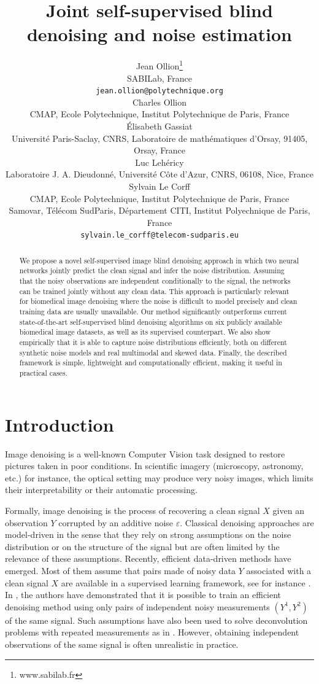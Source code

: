 \documentclass{article}
\title{Joint self-supervised blind denoising and noise estimation}
\author{%
  Jean Ollion\thanks{www.sabilab.fr}\\
  SABILab, France\\
  \texttt{jean.ollion@polytechnique.org} \\
  \And
  Charles Ollion\\
  CMAP, Ecole Polytechnique, Institut Polytechnique de Paris, France\\
  \And
  \'Elisabeth Gassiat\\
  Universit\'e Paris-Saclay, CNRS, Laboratoire de math\'ematiques d'Orsay, 91405, Orsay, France\\
  \And
  Luc Leh\'ericy\\
  Laboratoire J. A. Dieudonn\'e, Universit\'e C\^ote d'Azur, CNRS, 06108, Nice, France\\
  \And
  Sylvain Le Corff \\
  CMAP, Ecole Polytechnique, Institut Polytechnique de Paris, France\\
  Samovar, T\'el\'ecom SudParis, D\'epartement CITI, Institut Polyechnique de Paris, France\\
  \texttt{sylvain.le_corff@telecom-sudparis.eu} \\
}
\begin{document}
\maketitle

\begin{abstract}
We propose a novel self-supervised image blind denoising approach in which two neural networks jointly predict the clean signal and infer the noise distribution.
Assuming that the noisy observations are independent conditionally to the signal, the networks can be trained jointly without any clean data. This approach is particularly relevant for biomedical image denoising where the noise is difficult to model precisely and clean training data are usually unavailable. Our method significantly outperforms current state-of-the-art self-supervised blind denoising algorithms on six publicly available biomedical image datasets, as well as its supervised counterpart. We also show empirically that it is able to capture noise distributions efficiently, both on different synthetic noise models and real multimodal and skewed data.
Finally, the described framework is simple, lightweight and computationally efficient, making it useful in practical cases.
\end{abstract}

\section{Introduction}
\label{sec:introduction}

Image denoising is a well-known Computer Vision task designed to restore pictures taken in poor conditions. In scientific imagery (microscopy, astronomy, etc.) for instance,  the optical setting may produce very noisy images, which limits their interpretability or their automatic processing.

Formally, image denoising is the process of recovering a clean signal $X$ given an observation $Y$ corrupted by an additive noise $\varepsilon$. Classical denoising approaches are model-driven in the sense that they rely on strong assumptions on the noise distribution or on the structure of the signal but are often limited by the relevance of these assumptions.
Recently, efficient data-driven methods have emerged. Most of them assume that pairs made of noisy data $Y$ associated with a clean signal $X$ are available in a supervised learning framework, see for instance \cite{weigert2017content}. In \cite{lehtinen2018noise2noise}, the authors have demonstrated that it is possible to train an efficient denoising method using only pairs of independent noisy measurements $(Y^1, Y^2)$ of the same signal. Such assumptions have also been used to solve deconvolution problems with repeated measurements as in \cite{delaigle2008deconvolution}. However, obtaining independent observations of the same signal is often unrealistic in practice.
\end{document}
